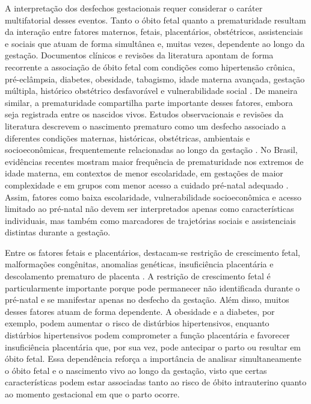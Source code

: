 A interpretação dos desfechos gestacionais requer considerar o caráter multifatorial 
desses eventos. Tanto o óbito fetal quanto a prematuridade resultam da interação 
entre fatores maternos, fetais, placentários, obstétricos, assistenciais e sociais 
que atuam de forma simultânea e, muitas vezes, dependente ao longo da gestação. 
Documentos clínicos e revisões da literatura apontam de forma recorrente a associação 
de óbito fetal com condições como hipertensão crônica, pré-eclâmpsia, diabetes, 
obesidade, tabagismo, idade materna avançada, gestação múltipla, histórico obstétrico 
desfavorável e vulnerabilidade social \cite{Lawn2016,ACOG2020Stillbirth,Sun2018,zile2019maternal}. 
De maneira similar, a prematuridade compartilha parte importante desses fatores, embora 
seja registrada entre os nascidos vivos. Estudos observacionais e revisões da literatura 
descrevem o nascimento prematuro como um desfecho associado a diferentes condições 
maternas, históricas, obstétricas, ambientais e socioeconômicas, frequentemente 
relacionadas ao longo da gestação \cite{Mitrogiannis2023PretermRisk}. No Brasil, 
evidências recentes mostram maior frequência de prematuridade nos extremos de idade 
materna, em contextos de menor escolaridade, em gestações de maior complexidade e em 
grupos com menor acesso a cuidado pré-natal adequado 
\cite{Victor2025PretermBrazil,BrasilBoletimPrematuridade2024}. Assim, fatores como 
baixa escolaridade, vulnerabilidade socioeconômica e acesso limitado ao pré-natal 
não devem ser interpretados apenas como características individuais, mas também 
como marcadores de trajetórias sociais e assistenciais distintas durante a gestação.

Entre os fatores fetais e placentários, destacam-se restrição de crescimento
fetal, malformações congênitas, anomalias genéticas, insuficiência placentária e
descolamento prematuro de placenta \cite{gardosi2013maternal,smith2007stillbirth,pinar2014placental}. 
A restrição de crescimento fetal é particularmente importante porque pode permanecer 
não identificada durante o pré-natal e se manifestar apenas no desfecho da gestação. 
Além disso, muitos desses fatores atuam de forma dependente. A obesidade e a diabetes, 
por exemplo, podem aumentar o risco de distúrbios hipertensivos, enquanto distúrbios 
hipertensivos podem comprometer a função placentária e favorecer insuficiência 
placentária que, por sua vez, pode antecipar o parto ou resultar em óbito fetal. Essa 
dependência reforça a importância de analisar simultaneamente o óbito fetal e o 
nascimento vivo ao longo da gestação, visto que certas características podem estar 
associadas tanto ao risco de óbito intrauterino quanto ao momento gestacional em 
que o parto ocorre.

